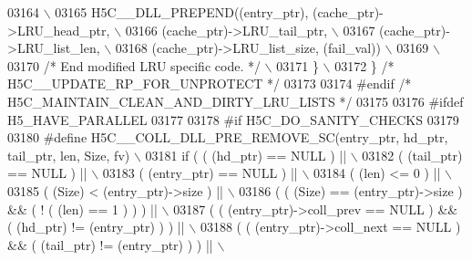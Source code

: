 \begin{DoxyCode}
03164 \textcolor{preprocessor}{                                                                           \(\backslash\)}
03165 \textcolor{preprocessor}{        H5C\_\_DLL\_PREPEND((entry\_ptr), (cache\_ptr)->LRU\_head\_ptr,           \(\backslash\)}
03166 \textcolor{preprocessor}{                         (cache\_ptr)->LRU\_tail\_ptr,                        \(\backslash\)}
03167 \textcolor{preprocessor}{                         (cache\_ptr)->LRU\_list\_len,                        \(\backslash\)}
03168 \textcolor{preprocessor}{                         (cache\_ptr)->LRU\_list\_size, (fail\_val))           \(\backslash\)}
03169 \textcolor{preprocessor}{                                                                           \(\backslash\)}
03170 \textcolor{preprocessor}{        }\textcolor{comment}{/* End modified LRU specific code. */}\textcolor{preprocessor}{                              \(\backslash\)}
03171 \textcolor{preprocessor}{    \}                                                                      \(\backslash\)}
03172 \textcolor{preprocessor}{\} }\textcolor{comment}{/* H5C\_\_UPDATE\_RP\_FOR\_UNPROTECT */}\textcolor{preprocessor}{}
03173 
03174 \textcolor{preprocessor}{#endif }\textcolor{comment}{/* H5C\_MAINTAIN\_CLEAN\_AND\_DIRTY\_LRU\_LISTS */}\textcolor{preprocessor}{}
03175 
03176 \textcolor{preprocessor}{#ifdef H5\_HAVE\_PARALLEL}
03177 
03178 \textcolor{preprocessor}{#if H5C\_DO\_SANITY\_CHECKS}
03179 
03180 \textcolor{preprocessor}{#define H5C\_\_COLL\_DLL\_PRE\_REMOVE\_SC(entry\_ptr, hd\_ptr, tail\_ptr, len, Size, fv) \(\backslash\)}
03181 \textcolor{preprocessor}{if ( ( (hd\_ptr) == NULL ) ||                                                   \(\backslash\)}
03182 \textcolor{preprocessor}{     ( (tail\_ptr) == NULL ) ||                                                 \(\backslash\)}
03183 \textcolor{preprocessor}{     ( (entry\_ptr) == NULL ) ||                                                \(\backslash\)}
03184 \textcolor{preprocessor}{     ( (len) <= 0 ) ||                                                         \(\backslash\)}
03185 \textcolor{preprocessor}{     ( (Size) < (entry\_ptr)->size ) ||                                         \(\backslash\)}
03186 \textcolor{preprocessor}{     ( ( (Size) == (entry\_ptr)->size ) && ( ! ( (len) == 1 ) ) ) ||            \(\backslash\)}
03187 \textcolor{preprocessor}{     ( ( (entry\_ptr)->coll\_prev == NULL ) && ( (hd\_ptr) != (entry\_ptr) ) ) ||  \(\backslash\)}
03188 \textcolor{preprocessor}{     ( ( (entry\_ptr)->coll\_next == NULL ) && ( (tail\_ptr) != (entry\_ptr) ) ) || \(\backslash\)}

\end{DoxyCode}
